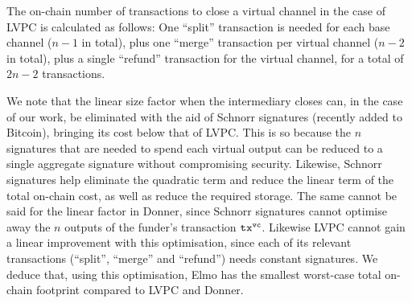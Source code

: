   The on-chain number of transactions to close a virtual channel in the case of
  LVPC is calculated as follows: One ``split'' transaction is needed for each
  base channel ($n-1$ in total), plus one ``merge'' transaction per virtual
  channel ($n-2$ in total), plus a single ``refund'' transaction for the virtual
  channel, for a total of $2n-2$ transactions.

  We note that the linear size factor when the intermediary closes can, in the
  case of our work, be eliminated with the aid of Schnorr signatures (recently
  added to Bitcoin), bringing its cost below that of LVPC. This is so
  because the $n$ signatures that are
  needed to spend each virtual output can be reduced to a single aggregate
  signature without compromising security. Likewise, Schnorr
  signatures help eliminate the quadratic term and reduce the linear term of the
  total on-chain cost, as well as reduce the required storage. The same cannot
  be said for the linear factor in Donner,
  since Schnorr signatures cannot optimise away the $n$ outputs of the
  funder's transaction $\texttt{tx}^{\mathtt{vc}}$. Likewise LVPC cannot gain a linear
  improvement with this optimisation, since each of its relevant transactions
  (``split'', ``merge'' and ``refund'') needs constant
  signatures. We deduce that, using this optimisation, Elmo has the smallest
  worst-case total on-chain footprint compared to LVPC and Donner.
